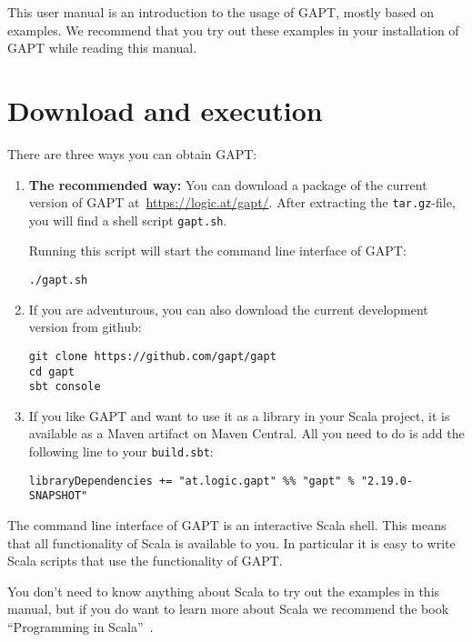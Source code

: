\documentclass[a4paper,11pt]{book}
\begin{document}
This user manual is an introduction to the usage of GAPT, mostly based on examples.
We recommend that you try out these examples in your installation of GAPT while
reading this manual.

\chapter{Download and execution}

There are three ways you can obtain GAPT:

\begin{enumerate}

  \item {\bfseries The recommended way:}  You can download a package of the current
        version of GAPT at~\url{https://logic.at/gapt/}.  After extracting
        the \texttt{tar.gz}-file, you will find a shell script \texttt{gapt.sh}.

        Running this script will start the command line interface of GAPT:
        \begin{lstlisting}
./gapt.sh
\end{lstlisting}

  \item If you are adventurous, you can also download the current development
        version from github:
        \begin{lstlisting}
git clone https://github.com/gapt/gapt
cd gapt
sbt console
\end{lstlisting}

  \item If you like GAPT and want to use it as a library in your Scala project,
        it is available as a Maven artifact on Maven Central.  All you need to do is add
        the following line to your \verb,build.sbt,:
        \begin{lstlisting}
libraryDependencies += "at.logic.gapt" %% "gapt" % "2.19.0-SNAPSHOT"
\end{lstlisting}

\end{enumerate}

The command line interface of GAPT is an interactive Scala shell.  This means
that all functionality of Scala is available to you.  In particular it is easy
to write Scala scripts that use the functionality of GAPT.

You don't need to know anything about Scala to try out the examples in this
manual, but if you do want to learn more about Scala we recommend the book
``Programming in Scala''~\cite{odersky2008programming}.
\end{document}
